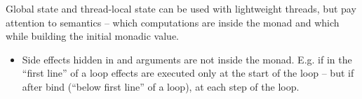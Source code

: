 \documentclass{beamer}
\newcommand{\tmverbatim}[1]{\text{{\ttfamily{#1}}}}
\begin{document}
Global state and thread-local state can be used with lightweight threads, but
pay attention to semantics -- which computations are inside the monad and
which while building the initial monadic value.
\begin{itemize}
  \item Side effects hidden in \tmverbatim{return} and \tmverbatim{emit}
  arguments are not inside the monad. E.g. if in the ``first line'' of a loop
  effects are executed only at the start of the loop -- but if after bind
  (``below first line'' of a loop), at each step of the loop.
\end{itemize}
{\small{{}{}{\hlopt{=}}{\hlendline{}}\\
{}{\hlopt{(}}{}{\hlendline{}}\\
{}{\hlopt{(}}{}{}{}{}{}{}{\hlopt{;
}}{}{}{}{\hlopt{);}}{\hlendline{}}\\
{\hlstd{ \ \ \ \ \ }}{\hlopt{() <-- }}{}{\hlopt{;}}{\hlendline{}}\\
{}{\hlopt{(}}{}{}{}{}{}{}{\hlopt{;
}}{}{}{}{\hlopt{);}}{\hlendline{}}\\
{\hlstd{ \ \ \ \ \ }}{\hlopt{() <-- }}{}{\hlopt{;}}{\hlendline{}}\\
{}{\hlopt{(}}{}{}{}{}{}{}{\hlopt{;
}}{}{}{}{\hlopt{);}}{\hlendline{}}\\
{\hlstd{ \ \ \ \ \ }}{\hlopt{() <-- }}{}{\hlopt{;}}{\hlendline{}}\\
{}{\hlopt{(}}{}{}{}{}{}{}{\hlopt{;
}}{}{}{}{\hlopt{);}}{\hlendline{}}\\
{\hlstd{ \ \ \ \ \ }}{\hlopt{() <-- }}{}{\hlopt{;}}{\hlendline{}}\\
{}{\hlopt{(}}{}{}{}{}{}{}{\hlopt{;
}}{}{}{}{\hlopt{))}}{\hlendline{}}\\
{}{}{\hlopt{, }}{}}}
\end{document}
